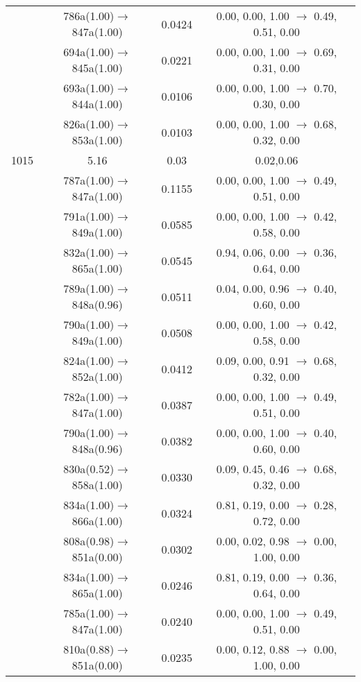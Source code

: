 \documentclass[10pt,a4paper]{article}
\begin{document}
\begin{longtable}{c|c|c|c}
 	& 786a(1.00)$\rightarrow$847a(1.00) &	 0.0424 &	 0.00, 0.00, 1.00 $\rightarrow$ 0.49, 0.51, 0.00 \\ 
 	& 694a(1.00)$\rightarrow$845a(1.00) &	 0.0221 &	 0.00, 0.00, 1.00 $\rightarrow$ 0.69, 0.31, 0.00 \\ 
 	& 693a(1.00)$\rightarrow$844a(1.00) &	 0.0106 &	 0.00, 0.00, 1.00 $\rightarrow$ 0.70, 0.30, 0.00 \\ 
 	& 826a(1.00)$\rightarrow$853a(1.00) &	 0.0103 &	 0.00, 0.00, 1.00 $\rightarrow$ 0.68, 0.32, 0.00 \\ 
 \hline1015 &	 5.16 &	 0.03 &	 0.02,0.06 \\ 
  	& 787a(1.00)$\rightarrow$847a(1.00) &	 0.1155 &	 0.00, 0.00, 1.00 $\rightarrow$ 0.49, 0.51, 0.00 \\ 
 	& 791a(1.00)$\rightarrow$849a(1.00) &	 0.0585 &	 0.00, 0.00, 1.00 $\rightarrow$ 0.42, 0.58, 0.00 \\ 
 	& 832a(1.00)$\rightarrow$865a(1.00) &	 0.0545 &	 0.94, 0.06, 0.00 $\rightarrow$ 0.36, 0.64, 0.00 \\ 
 	& 789a(1.00)$\rightarrow$848a(0.96) &	 0.0511 &	 0.04, 0.00, 0.96 $\rightarrow$ 0.40, 0.60, 0.00 \\ 
 	& 790a(1.00)$\rightarrow$849a(1.00) &	 0.0508 &	 0.00, 0.00, 1.00 $\rightarrow$ 0.42, 0.58, 0.00 \\ 
 	& 824a(1.00)$\rightarrow$852a(1.00) &	 0.0412 &	 0.09, 0.00, 0.91 $\rightarrow$ 0.68, 0.32, 0.00 \\ 
 	& 782a(1.00)$\rightarrow$847a(1.00) &	 0.0387 &	 0.00, 0.00, 1.00 $\rightarrow$ 0.49, 0.51, 0.00 \\ 
 	& 790a(1.00)$\rightarrow$848a(0.96) &	 0.0382 &	 0.00, 0.00, 1.00 $\rightarrow$ 0.40, 0.60, 0.00 \\ 
 	& 830a(0.52)$\rightarrow$858a(1.00) &	 0.0330 &	 0.09, 0.45, 0.46 $\rightarrow$ 0.68, 0.32, 0.00 \\ 
 	& 834a(1.00)$\rightarrow$866a(1.00) &	 0.0324 &	 0.81, 0.19, 0.00 $\rightarrow$ 0.28, 0.72, 0.00 \\ 
 	& 808a(0.98)$\rightarrow$851a(0.00) &	 0.0302 &	 0.00, 0.02, 0.98 $\rightarrow$ 0.00, 1.00, 0.00 \\ 
 	& 834a(1.00)$\rightarrow$865a(1.00) &	 0.0246 &	 0.81, 0.19, 0.00 $\rightarrow$ 0.36, 0.64, 0.00 \\ 
 	& 785a(1.00)$\rightarrow$847a(1.00) &	 0.0240 &	 0.00, 0.00, 1.00 $\rightarrow$ 0.49, 0.51, 0.00 \\ 
 	& 810a(0.88)$\rightarrow$851a(0.00) &	 0.0235 &	 0.00, 0.12, 0.88 $\rightarrow$ 0.00, 1.00, 0.00 \\ 

\end{longtable}
\end{document}
